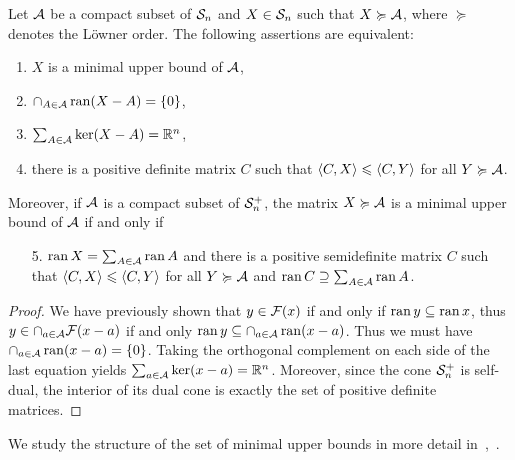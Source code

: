 \documentclass[main]{subfiles}
\begin{document}
\begin{theorem}
\label{cor:mub_snp}
Let $\mathcal{A}$ be a compact subset of $\mathcal{S}_n$ and $X \in \mathcal{S}_n$ such that $X \succcurlyeq \mathcal{A}$, where $\succeq$ denotes the L\"owner order.
The following assertions are equivalent:
\begin{enumerate}
\item $X$ is a minimal upper bound of $\mathcal{A}$,
\item $\cap_{A \in \mathcal{A}} \operatorname{ran}(X-A) = \{ 0 \}$,
\item $\sum_{A  \in \mathcal{A}} \ker(X-A) = \mathbb{R}^n$,
\item there is a positive definite matrix $C$ such that $\langle {C} , {X} \rangle \leqslant \langle {C} , {Y} \rangle$ for all $Y \succcurlyeq \mathcal{A}$.
\end{enumerate}
Moreover, if $\mathcal{A}$ is a compact subset of $\mathcal{S}_n^+$, the matrix $X \succcurlyeq \mathcal{A}$ is a minimal upper bound of $\mathcal{A}$ if and only if 
\begin{enumerate}
\item[5.]
$\operatorname{ran} X = \sum_{A \in \mathcal{A}} \operatorname{ran} A$ and there is a positive semidefinite matrix $C$ such that
$\langle {C} , {X} \rangle \leqslant \langle {C} , {Y} \rangle$  for all $Y \succcurlyeq \mathcal{A}$ and $\operatorname{ran} C \supseteq \sum_{A \in \mathcal{A}} \operatorname{ran} A$.
\end{enumerate}
 \end{theorem}
 
 \begin{proof}
 We have previously shown that $y \in \mathcal{F}(x)$ if and only if $\operatorname{ran} y \subseteq \operatorname{ran} x$, thus $y \in \cap_{a \in \mathcal{A}} \mathcal{F}(x-a)$ if and only $\operatorname{ran} y \subseteq \cap_{a \in \mathcal{A}} \operatorname{ran}(x-a)$. Thus we must have $\cap_{a \in \mathcal{A}} \operatorname{ran}(x-a) = \{0\}$.
Taking the orthogonal complement on each side of the last equation yields $\sum_{a \in \mathcal{A}} \ker(x-a) = \mathbb{R}^n$.
Moreover, since the cone $\mathcal{S}_n^+$ is self-dual, the interior of its dual cone is exactly the set of positive definite matrices.
 \end{proof}

We study the structure of the set of minimal upper bounds in more detail in~,~.
\end{document}
